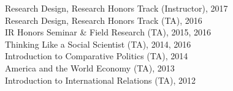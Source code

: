 \documentclass[11pt]{article}
\begin{document}
\begin{minipage}[t]{.79\textwidth}
		\hspace*{.1in} Research Design, Research Honors Track (Instructor), 2017 \\
		\hspace*{.1in} Research Design, Research Honors Track (TA),    2016\\
		\hspace*{.1in} IR Honors Seminar \& Field Research (TA), 2015, 2016 \\
		\hspace*{.1in} Thinking Like a Social Scientist (TA),   2014,  2016 \\
		\hspace*{.1in} Introduction to Comparative Politics (TA),  2014\\
		\hspace*{.1in} America and the World Economy (TA),  2013\\
		\hspace*{.1in} Introduction to International Relations (TA),  2012\\
\end{minipage}
\end{document}
